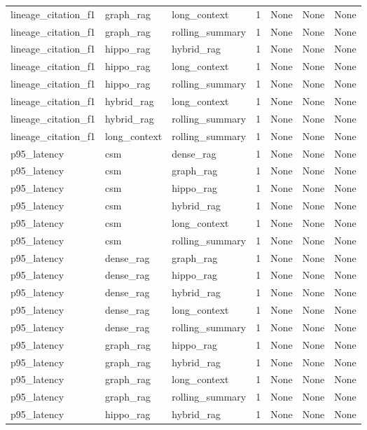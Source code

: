 \begin{tabular}{lllllll}
lineage\_citation\_f1 & graph\_rag & long\_context & 1 & None & None & None \\
lineage\_citation\_f1 & graph\_rag & rolling\_summary & 1 & None & None & None \\
lineage\_citation\_f1 & hippo\_rag & hybrid\_rag & 1 & None & None & None \\
lineage\_citation\_f1 & hippo\_rag & long\_context & 1 & None & None & None \\
lineage\_citation\_f1 & hippo\_rag & rolling\_summary & 1 & None & None & None \\
lineage\_citation\_f1 & hybrid\_rag & long\_context & 1 & None & None & None \\
lineage\_citation\_f1 & hybrid\_rag & rolling\_summary & 1 & None & None & None \\
lineage\_citation\_f1 & long\_context & rolling\_summary & 1 & None & None & None \\
p95\_latency & csm & dense\_rag & 1 & None & None & None \\
p95\_latency & csm & graph\_rag & 1 & None & None & None \\
p95\_latency & csm & hippo\_rag & 1 & None & None & None \\
p95\_latency & csm & hybrid\_rag & 1 & None & None & None \\
p95\_latency & csm & long\_context & 1 & None & None & None \\
p95\_latency & csm & rolling\_summary & 1 & None & None & None \\
p95\_latency & dense\_rag & graph\_rag & 1 & None & None & None \\
p95\_latency & dense\_rag & hippo\_rag & 1 & None & None & None \\
p95\_latency & dense\_rag & hybrid\_rag & 1 & None & None & None \\
p95\_latency & dense\_rag & long\_context & 1 & None & None & None \\
p95\_latency & dense\_rag & rolling\_summary & 1 & None & None & None \\
p95\_latency & graph\_rag & hippo\_rag & 1 & None & None & None \\
p95\_latency & graph\_rag & hybrid\_rag & 1 & None & None & None \\
p95\_latency & graph\_rag & long\_context & 1 & None & None & None \\
p95\_latency & graph\_rag & rolling\_summary & 1 & None & None & None \\
p95\_latency & hippo\_rag & hybrid\_rag & 1 & None & None & None \\

\end{tabular}

